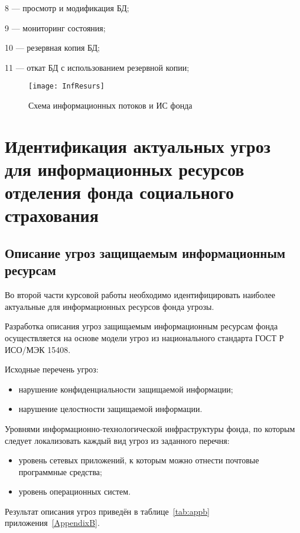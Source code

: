 8 --- просмотр и модификация БД;

9 --- мониторинг состояния;

10 --- резервная копия БД;

11 --- откат БД с использованием резервной копии;

\begin{figure}[h]
  \centering
  \texttt{[image: InfResurs]}
  \caption{Схема информационных потоков и ИС фонда}
  \label{fig:infresurs}  
\end{figure}

\cleardoublepage

\section{Идентификация актуальных угроз для информационных ресурсов
  отделения фонда социального страхования}
\label{sec:2}

\subsection{Описание угроз защищаемым информационным ресурсам}

\point Во второй части курсовой работы необходимо идентифицировать наиболее
актуальные для информационных ресурсов фонда угрозы.

Разработка описания угроз защищаемым информационным ресурсам фонда
осуществляется на основе модели угроз из национального стандарта ГОСТ
Р ИСО/МЭК 15408.

\point Исходные перечень угроз:

\begin{itemize}
\item нарушение конфиденциальности защищаемой информации;
\item нарушение целостности защищаемой информации.
\end{itemize}

\point Уровнями информационно-технологической инфраструктуры фонда, по
которым следует локализовать каждый вид угроз из заданного перечня:

\begin{itemize}
\item уровень сетевых приложений, к которым можно отнести почтовые
  программные средства;
\item уровень операционных систем.
\end{itemize}

Результат описания угроз приведён в таблице~\ref{tab:appb}
приложения~\ref{AppendixB}. 

